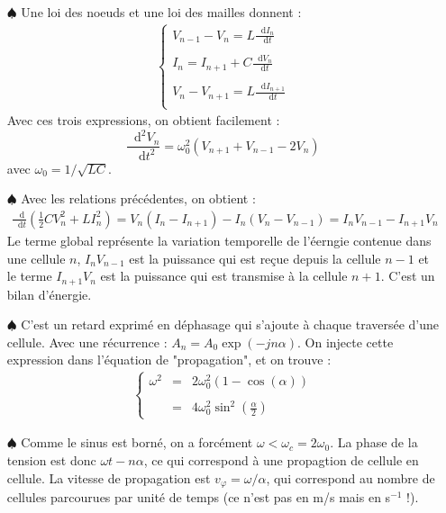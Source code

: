 \documentclass{report}
\newcommand*\dif{\mathop{}\!\mathrm{d}}
\begin{document}
\begin{itemize}

	\item[$\spadesuit$] Une loi des noeuds et une loi des mailles donnent : 
	\begin{align*}
	\left\lbrace
	\begin{array}{ccc}
	V_{n-1}-V_{n}=L\frac{\dif I_{n}}{\dif t}\\
	\\
	I_{n}=I_{n+1}+C\frac{\dif V_{n}}{\dif t}\\
	\\
	V_{n}-V_{n+1}=L\frac{\dif I_{n+1}}{\dif t}\\
	\end{array}\right.
	\end{align*}		
	Avec ces trois expressions, on obtient facilement :
	\begin{equation}
		\frac{\dif^2 V_n}{\dif t^2} =\omega_0^2(V_{n+1}+V_{n-1}-2V_n)
		\label{eq:prop}
	\end{equation}
	avec $\omega_0=1/\sqrt{LC}$.
	 \item[$\spadesuit$] Avec les relations précédentes, on obtient : 
	 \begin{align*}
	 \frac{\dif}{\dif t}\left( \frac{1}{2}CV_n^2 + LI_n^2 \right) =V_n(I_{n}-I_{n+1})- I_n(V_{n}-V_{n-1})=I_nV_{n-1}-I_{n+1}V_n
	 \end{align*}
	 Le terme global représente la variation temporelle de l'éerngie contenue dans une cellule $n$, $I_nV_{n-1}$ est la puissance qui est reçue depuis la cellule $n-1$ et le terme $I_{n+1}V_n$ est la puissance qui est transmise à la cellule $n+1$. C'est un bilan d'énergie.
	 
	\item[$\spadesuit$] C'est un retard exprimé en déphasage qui s'ajoute à chaque traversée d'une cellule. Avec une récurrence : $A_n=A_0\exp(-jn\alpha)$. On injecte cette expression dans l'équation de "propagation", et on trouve :
	\begin{align*}
	\left\lbrace
	\begin{array}{ccc}
	\omega^2&=&2\omega_0^2(1-\cos(\alpha)) \\
	\\
	& =  &4\omega_0^2\sin^2\left(\frac{\alpha}{2}\right) 
	\end{array}\right.
	\end{align*}	

	\item[$\spadesuit$] Comme le sinus est borné, on a forcément $\omega<\omega_c=2\omega_0$. La phase de la tension est donc $\omega t -n\alpha$, ce qui correspond à une propagtion de cellule en cellule. La vitesse de propagation est $v_\varphi=\omega/\alpha$, qui correspond au nombre de cellules parcourues par unité de temps (ce n'est pas en m/s mais en s$^{-1}$ !).
	

\end{itemize}
\end{document}
